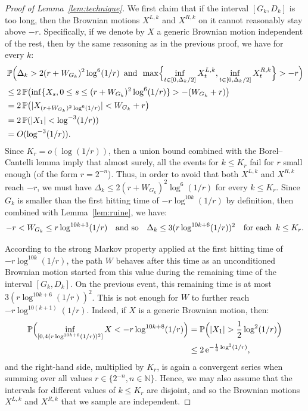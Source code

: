 \documentclass[10pt,a4paper]{amsart}
\newcommand{\N}{\mathbb{N}}
\newcommand{\e}{\operatorname{e}}
\renewcommand{\P}{\mathop{}\!\mathbb{P}}
\begin{document}
\begin{proof}[Proof of Lemma~\ref{lem:technique}]
We first claim that if the interval $[G_k,D_k]$ is too long, then the Brownian motions $X^{L,k}$ and $X^{R,k}$ on it cannot reasonably stay above $-r$. Specifically, if we denote by $X$ a generic Brownian motion independent of the rest, then by the same reasoning as in the previous proof, we have for every $k$:
\begin{align*}
&\P\Bigl(\Delta_k > 2(r+W_{G_k})^2 \log^6(1/r) \enskip\text{and}\enskip \max\Bigl\{\inf_{t \in [0,\Delta_k/2]} X^{L,k}_t, \inf_{t \in [0,\Delta_k/2]} X^{R,k}_t\Bigr\} > -r \Bigr)
\\
&\leq 2 \P\bigl(\inf\{X_s , 0 \leq s \leq (r+W_{G_k})^2 \log^6(1/r)\} > -(W_{G_k}+r) \bigr)
\\
&= 2 \P\bigl(|X_{(r+W_{G_k})^2 \log^6(1/r)}| < W_{G_k}+r \bigr)
\\
&= 2 \P(|X_1| < \log^{-3}(1/r) )
\\
&= O(\log^{-3}(1/r))
.\end{align*}
Since $K_r = o(\log(1/r))$, then a union bound combined with the Borel--Cantelli lemma imply that almost surely, all the events for $k \leq K_r$ fail for $r$ small enough (of the form $r=2^{-n}$).
Thus, in order to avoid that both $X^{L,k}$ and $X^{R,k}$ reach $-r$, we must have $\Delta_k \leq 2(r+W_{G_k})^2 \log^6(1/r)$ for every $k \leq K_r$. 
Since $G_k$ is smaller than the first hitting time of $-r \log^{10k}(1/r)$ by definition, then combined with Lemma~\ref{lem:ruine}, we have:
\[-r < W_{G_k} \leq r \log^{10k+3}(1/r)
\quad\text{and so}\quad
\Delta_k \leq 3(r \log^{10k+6}(1/r))^2 \quad\text{for each}\enskip k \leq K_r.\]

According to the strong Markov property applied at the first hitting time of $-r \log^{10k}(1/r)$, the path $W$ behaves after this time as an unconditioned Brownian motion started from this value during the remaining time of the interval $[G_k,D_k]$.
On the previous event, this remaining time is at most $3(r \log^{10k+6}(1/r))^2$.
This is not enough for $W$ to further reach $-r \log^{10(k+1)}(1/r)$. Indeed, if $X$ is a generic Brownian motion, then:
\begin{align*}
\P\Bigl(\inf_{[0,4(r \log^{10k+6}(1/r))^2]} X < -r \log^{10k+8}(1/r)\Bigr)
&= \P\Bigl(|X_1| > \frac{1}{2} \log^{2}(1/r)\Bigr)
\\
&\leq 2 \e^{- \frac{1}{4} \log^{2}(1/r)}
,\end{align*}
and the right-hand side, multiplied by $K_r$, is again a convergent series when summing over all values $r \in \{2^{-n}, n \in \N\}$.
Hence, we may also assume that the intervals for different values of $k \leq K_r$ are disjoint, and so the Brownian motions $X^{L,k}$ and $X^{R,k}$ that we sample are independent.


\end{proof}
\end{document}
